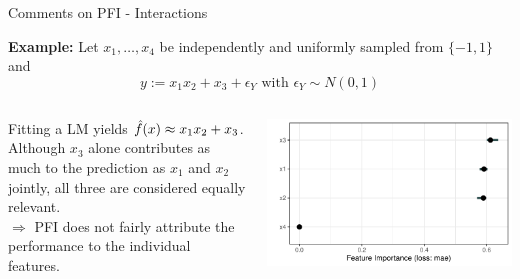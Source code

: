 \documentclass[10pt,compress,t,notes=noshow, xcolor=table]{beamer}
\begin{document}
\begin{frame}{Comments on PFI - Interactions}

\textbf{Example:} Let $x_1, \dots, x_4$ be independently and uniformly sampled from $\{-1, 1\}$ and 
$$y:= x_1 x_2 + x_3 + \epsilon_Y \text{ with } \epsilon_Y \sim N(0, 1)$$

\begin{columns}[T, totalwidth = \textwidth]
\begin{column}{0.5\textwidth}

Fitting a LM yields $\hat{f}(x) \approx x_1 x_2 + x_3$.\\
\lz\pause
Although $x_3$ alone contributes as much to the prediction as $x_1$ and $x_2$ jointly, all three are considered equally relevant.\\
\lz
$\Rightarrow$ PFI does not fairly attribute the performance to the individual features.

\end{column}
\begin{column}{0.5\textwidth}
\centering
  \includegraphics[width=\linewidth]{figure_man/pfi_interactions.pdf}
\end{column}
\end{columns}


\end{frame}
\end{document}
